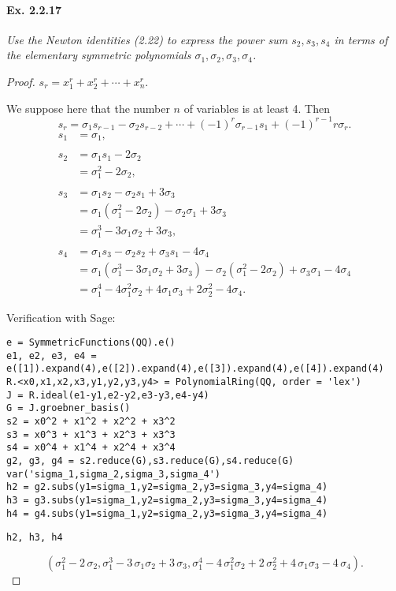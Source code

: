 \documentclass[11pt,a4paper]{article}
\begin{document}
\paragraph{Ex. 2.2.17}
{\it Use the Newton identities (2.22) to express the power sum $s_2,s_3,s_4$ in terms of the elementary symmetric polynomials $\sigma_1,\sigma_2,\sigma_3,\sigma_4$.
}

\begin{proof}
$s_r = x_1^r+x_2^r+\cdots+x_n^r$.

 We suppose here that the number $n$  of variables is at least 4.
Then $$s_r = \sigma_1 s_{r-1}-\sigma_2 s_{r-2}+\cdots+(-1)^r\sigma_{r-1}s_1 + (-1)^{r-1} r \sigma_r.$$
\begin{align*}
s_1 &= \sigma_1,\\
\\
s_2 &= \sigma_1 s_1 - 2 \sigma_2\\
&= \sigma_1^2-2\sigma_2,\\
\\
s_3 &= \sigma_1 s_2 -  \sigma_2s_1 +3\sigma_3\\
&=\sigma_1(\sigma_1^2 - 2 \sigma_2) - \sigma_2 \sigma_1 + 3 \sigma_3\\
&=\sigma_1^3-3\sigma_1\sigma_2+3\sigma_3,\\
\\
s_4 &= \sigma_1s_3 - \sigma_2 s_2 + \sigma_3 s_1 - 4 \sigma_4\\
&=\sigma_1(\sigma_1^3-3\sigma_1\sigma_2+3\sigma_3) - \sigma_2(\sigma_1^2-2\sigma_2)+ \sigma_3\sigma_1 - 4 \sigma_4\\
&=\sigma_1^4-4\sigma_1^2\sigma_2+4\sigma_1\sigma_3+2\sigma_2^2-4\sigma_4.
\end{align*}

Verification with Sage:

\begin{verbatim}
e = SymmetricFunctions(QQ).e()
e1, e2, e3, e4 = e([1]).expand(4),e([2]).expand(4),e([3]).expand(4),e([4]).expand(4)
R.<x0,x1,x2,x3,y1,y2,y3,y4> = PolynomialRing(QQ, order = 'lex')
J = R.ideal(e1-y1,e2-y2,e3-y3,e4-y4)
G = J.groebner_basis()
s2 = x0^2 + x1^2 + x2^2 + x3^2
s3 = x0^3 + x1^3 + x2^3 + x3^3
s4 = x0^4 + x1^4 + x2^4 + x3^4
g2, g3, g4 = s2.reduce(G),s3.reduce(G),s4.reduce(G)
var('sigma_1,sigma_2,sigma_3,sigma_4')
h2 = g2.subs(y1=sigma_1,y2=sigma_2,y3=sigma_3,y4=sigma_4)
h3 = g3.subs(y1=sigma_1,y2=sigma_2,y3=sigma_3,y4=sigma_4)
h4 = g4.subs(y1=sigma_1,y2=sigma_2,y3=sigma_3,y4=sigma_4)
\end{verbatim}

\begin{verbatim}
h2, h3, h4
\end{verbatim}
$$\left(\sigma_{1}^{2} - 2 \, \sigma_{2}, \sigma_{1}^{3} - 3 \, \sigma_{1}
\sigma_{2} + 3 \, \sigma_{3}, \sigma_{1}^{4} - 4 \, \sigma_{1}^{2}
\sigma_{2} + 2 \, \sigma_{2}^{2} + 4 \, \sigma_{1} \sigma_{3} - 4 \,
\sigma_{4}\right).$$
\end{proof}
\end{document}
